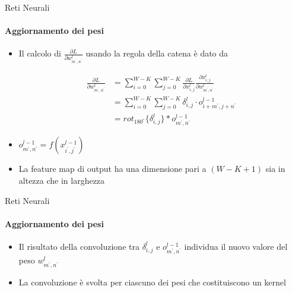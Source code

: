 \documentclass[
 ]{beamer}
\begin{document}
\begin{frame}{Reti Neurali}
    \framesubtitle{Aggiornamento dei pesi}
     \smallskip
     \begin{itemize} [<+->]
     \setlength\itemsep{1em}
     \item \large Il calcolo di $\frac{\partial L}{\partial w_{m^{\prime}, n^{\prime}}^l}$ usando la regola della catena è dato da
     
    \begin{equation*}
        \begin{split}
            \frac{\partial L}{\partial w_{m^{\prime}, n^{\prime}}^l} & = \sum_{i=0}^{W-K} \sum_{j=0}^{W-K} \frac{\partial L}{\partial x_{i,j}^{l}} \frac{\partial x_{i,j}^{l}}{\partial w_{m^{\prime},n^{\prime}}^l} \\[10pt]
           & = \sum_{i = 0}^{W - K}\sum_{j = 0}^{W - K} \delta_{i,j}^l \cdot o_{i + m^{\prime},j + n^{\prime}}^{l-1} \\[10pt]            
           & = rot_{180^\circ} \{ \delta_{i,j}^l \} * o_{m^{\prime},n^{\prime}}^{l-1} 
        \end{split}          
    \end{equation*} 
             
    \item \large $o_{m^{\prime},n^{\prime}}^{l-1} = f(x_{i^{\prime},j^{\prime}}^{l-1})$
    \item \large La feature map di output ha una dimensione pari a $(W - K + 1)$ sia in altezza che in larghezza   
    \end{itemize}     
\end{frame}

\begin{frame}{Reti Neurali}
    \framesubtitle{Aggiornamento dei pesi}
    
    \bigskip
    
     \begin{itemize} [<+->]
     \setlength\itemsep{3em}
    \item \large Il risultato della convoluzione tra $\delta_{i,j}^l$ e $o_{m^{\prime},n^{\prime}}^{l-1}$ individua il nuovo valore del peso $w_{m^{\prime}, n^{\prime}}^l$
    \item \large La convoluzione è svolta per ciascuno dei pesi che costituiscono un kernel     
    \end{itemize}     
\end{frame}
\end{document}

